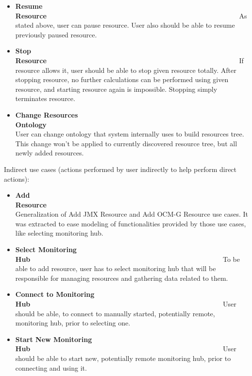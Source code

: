 \begin{itemize}
\item {\bf Resume Resource}~~~~~~~~~~~~~~~~~~~~~~~~~~~~~~~~~~~~~~~~~~~~~~~~~~~~~~~~\linebreak
As stated above, user can pause resource. User also should be able to resume previously paused resource.

\item {\bf Stop Resource}~~~~~~~~~~~~~~~~~~~~~~~~~~~~~~~~~~~~~~~~~~~~~~~~~~~~~~~~\linebreak
If resource allows it, user should be able to stop given resource totally. After stopping resource, no further calculations can be performed using given resource, and starting resource again is impossible. Stopping simply terminates resource.

\item {\bf Change Resources Ontology}~~~~~~~~~~~~~~~~~~~~~~~~~~~~~~~~~~~~~~~~~~~~~~~~~~~~~~~~\linebreak
User can change ontology that system internally uses to build resources tree. This change won\rq{}t be applied to currently discovered resource tree, but all newly added resources.

\end{itemize}


Indirect use cases (actions performed by user indirectly to help perform direct actions):

\begin{itemize}

\item {\bf Add Resource}~~~~~~~~~~~~~~~~~~~~~~~~~~~~~~~~~~~~~~~~~~~~~~~~~~~~~~~~\linebreak
Generalization of Add JMX Resource and Add OCM-G Resource use cases. It was extracted to ease modeling of functionalities provided by those use cases, like selecting monitoring hub.

\item {\bf Select Monitoring Hub}~~~~~~~~~~~~~~~~~~~~~~~~~~~~~~~~~~~~~~~~~~~~~~~~~~~~~~~~\linebreak
To be able to add resource, user has to select monitoring hub that will be responsible for managing resources and gathering data related to them.

\item {\bf Connect to Monitoring Hub}~~~~~~~~~~~~~~~~~~~~~~~~~~~~~~~~~~~~~~~~~~~~~~~~~~~~~~~~\linebreak
User should be able, to connect to manually started, potentially remote, monitoring hub, prior to selecting one.

\item {\bf Start New Monitoring Hub}~~~~~~~~~~~~~~~~~~~~~~~~~~~~~~~~~~~~~~~~~~~~~~~~~~~~~~~~\linebreak
User should be able to start new, potentially remote monitoring hub, prior to connecting and using it.

\end{itemize}

